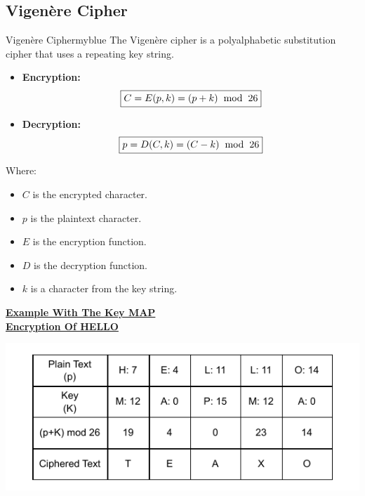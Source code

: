 \newpage

\subsection{Vigenère Cipher}

\begin{prettyBox}{Vigenère Cipher}{myblue}
The Vigenère cipher is a polyalphabetic substitution cipher that uses a repeating key string.

\begin{itemize}
    \item \textbf{Encryption:}  
        \[
        \boxed{C = E(p, k) = (p + k) \hspace{0.2cm} \text{mod} \hspace{0.2cm} 26}
        \]
    \item \textbf{Decryption:}  
        \[
        \boxed{p = D(C, k) = (C - k) \hspace{0.2cm} \text{mod} \hspace{0.2cm} 26}
        \] 
\end{itemize}

Where:
\begin{itemize}
    \item \( C \) is the encrypted character.
    \item \( p \) is the plaintext character.
    \item \( E \) is the encryption function.
    \item \( D \) is the decryption function.
    \item \( k \) is a character from the key string.
\end{itemize}

\end{prettyBox}

\vspace{1cm}

\textbf{\underline{Example With The Key MAP}}\\[0.15cm]
\textbf{\underline{Encryption Of HELLO}}

\vspace{0.25cm}

\begin{center}
    \includegraphics{Chapters/Diagram/Crypto/v1.drawio.pdf}
\end{center}

